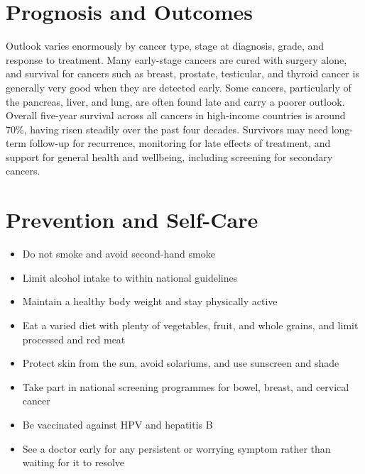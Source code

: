 \section*{Prognosis and Outcomes}
Outlook varies enormously by cancer type, stage at diagnosis, grade, and response to treatment. Many early-stage cancers are cured with surgery alone, and survival for cancers such as breast, prostate, testicular, and thyroid cancer is generally very good when they are detected early. Some cancers, particularly of the pancreas, liver, and lung, are often found late and carry a poorer outlook. Overall five-year survival across all cancers in high-income countries is around 70\%, having risen steadily over the past four decades. Survivors may need long-term follow-up for recurrence, monitoring for late effects of treatment, and support for general health and wellbeing, including screening for secondary cancers.

\section*{Prevention and Self-Care}
\begin{itemize}
    \item Do not smoke and avoid second-hand smoke
    \item Limit alcohol intake to within national guidelines
    \item Maintain a healthy body weight and stay physically active
    \item Eat a varied diet with plenty of vegetables, fruit, and whole grains, and limit processed and red meat
    \item Protect skin from the sun, avoid solariums, and use sunscreen and shade
    \item Take part in national screening programmes for bowel, breast, and cervical cancer
    \item Be vaccinated against HPV and hepatitis B
    \item See a doctor early for any persistent or worrying symptom rather than waiting for it to resolve
\end{itemize}

